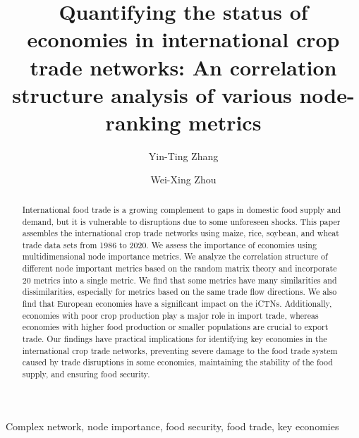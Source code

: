 \documentclass[preprint,3p,times,sort&compress]{elsarticle}
\begin{document}

\begin{frontmatter}
\newpage
\title{Quantifying the status of economies in international crop trade networks: An correlation structure analysis of various node-ranking metrics}


\author[SB,RCE]{Yin-Ting Zhang}
\author[SB,RCE,Math]{Wei-Xing Zhou}
\address[SB]{School of Business, East China University of Science and Technology, Shanghai 200237, China}
\address[RCE]{Research Center for Econophysics, East China University of Science and Technology, Shanghai 200237, China}
\address[Math]{School of Mathematics, East China University of Science and Technology, Shanghai 200237, China}
\begin{abstract}
International food trade is a growing complement to gaps in domestic food supply and demand, but it is vulnerable to disruptions due to some unforeseen shocks. This paper assembles the international crop trade networks using maize, rice, soybean, and wheat trade data sets from 1986 to 2020. We assess the importance of economies using multidimensional node importance metrics. We analyze the correlation structure of different node important metrics based on the random matrix theory and incorporate 20 metrics into a single metric. We find that some metrics have many similarities and dissimilarities, especially for metrics based on the same trade flow directions. We also find that European economies have a significant impact on the iCTNs. Additionally, economies with poor crop production play a major role in import trade, whereas economies with higher food production or smaller populations are crucial to export trade. Our findings have practical implications for identifying key economies in the international crop trade networks, preventing severe damage to the food trade system caused by trade disruptions in some economies, maintaining the stability of the food supply, and ensuring food security.

\end{abstract}

	
\begin{keyword} 
Complex network, node importance, food security, food trade, key economies

\end{keyword}

\end{frontmatter}
\end{document}
